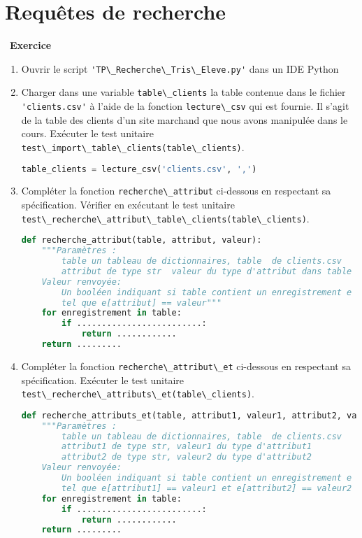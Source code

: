 \documentclass[
  11pt,
]{article}
\newcommand{\passthrough}[1]{#1}
\newcounter{exo}
\newenvironment{exercice}[1]
{\par \medskip   \addtocounter{exo}{1} \noindent  
\begin{bclogo}[arrondi =0.1,   noborder = true, logo=\bccrayon, marge=4]{~\textbf{Exercice} \textbf{\theexo} {\itshape #1} }  \par}
{
\end{bclogo}
 \par \bigskip }
\newcounter{def}
\newcounter{cours}
\begin{document}
\hypertarget{requuxeates-de-recherche}{%
\section{Requêtes de recherche}\label{requuxeates-de-recherche}}

\begin{exercice}{}

\begin{enumerate}
\def\labelenumi{\arabic{enumi}.}
\item
  Ouvrir le script
  \passthrough{\lstinline!'TP\_Recherche\_Tris\_Eleve.py'!} dans un IDE
  Python
\item
  Charger dans une variable \passthrough{\lstinline!table\_clients!} la
  table contenue dans le fichier \passthrough{\lstinline!'clients.csv'!}
  à l'aide de la fonction \passthrough{\lstinline!lecture\_csv!} qui est
  fournie. Il s'agit de la table des clients d'un site marchand que nous
  avons manipulée dans le cours. Exécuter le test unitaire
  \passthrough{\lstinline!test\_import\_table\_clients(table\_clients)!}.

\begin{lstlisting}[language=Python]
table_clients = lecture_csv('clients.csv', ',')
\end{lstlisting}
\item
  Compléter la fonction \passthrough{\lstinline!recherche\_attribut!}
  ci-dessous en respectant sa spécification. Vérifier en exécutant le
  test unitaire
  \passthrough{\lstinline!test\_recherche\_attribut\_table\_clients(table\_clients)!}.

\begin{lstlisting}[language=Python]
def recherche_attribut(table, attribut, valeur):
    """Paramètres : 
        table un tableau de dictionnaires, table  de clients.csv
        attribut de type str  valeur du type d'attribut dans table
    Valeur renvoyée:
        Un booléen indiquant si table contient un enregistrement e
        tel que e[attribut] == valeur"""
    for enregistrement in table:
        if .........................:
            return ............
    return .........
\end{lstlisting}
\item
  Compléter la fonction
  \passthrough{\lstinline!recherche\_attribut\_et!} ci-dessous en
  respectant sa spécification. Exécuter le test unitaire
  \passthrough{\lstinline!test\_recherche\_attributs\_et(table\_clients)!}.

\begin{lstlisting}[language=Python]
def recherche_attributs_et(table, attribut1, valeur1, attribut2, valeur2):
    """Paramètres : 
        table un tableau de dictionnaires, table  de clients.csv
        attribut1 de type str, valeur1 du type d'attribut1
        attribut2 de type str, valeur2 du type d'attribut2
    Valeur renvoyée:
        Un booléen indiquant si table contient un enregistrement e
        tel que e[attribut1] == valeur1 et e[attribut2] == valeur2 """
    for enregistrement in table:
        if .........................:
            return ............
    return .........
\end{lstlisting}
\end{enumerate}


\end{exercice}
\end{document}
